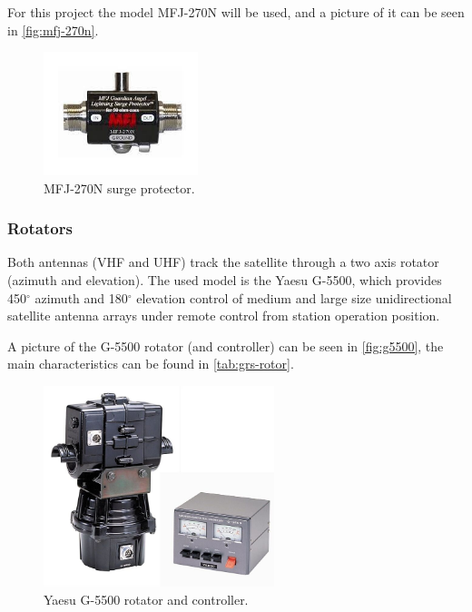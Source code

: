 For this project the model MFJ-270N will be used, and a picture of it can be seen in \autoref{fig:mfj-270n}.

\begin{figure}[!ht]
    \begin{center}
        \includegraphics[width=0.4\textwidth]{figures/mfj-270n.jpeg}
        \caption{MFJ-270N surge protector.}
        \label{fig:mfj-270n}
    \end{center}
\end{figure}

\subsubsection{Rotators}

Both antennas (VHF and UHF) track the satellite through a two axis rotator (azimuth and elevation). The used model is the Yaesu G-5500, which provides 450$^{\circ}$ azimuth and 180$^{\circ}$ elevation control of medium and large size unidirectional satellite antenna arrays under remote control from station operation position.

A picture of the G-5500 rotator (and controller) can be seen in \autoref{fig:g5500}, the main characteristics can be found in \autoref{tab:grs-rotor}.

\begin{figure}[!ht]
    \begin{center}
        \includegraphics[width=0.6\textwidth]{figures/g5500.jpg}
        \caption{Yaesu G-5500 rotator and controller.}
        \label{fig:g5500}
    \end{center}
\end{figure}

